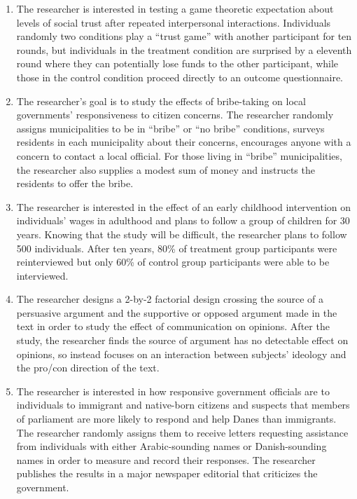 \documentclass[12pt,a4]{article}
\begin{document}
\begin{enumerate}
\item The researcher is interested in testing a game theoretic expectation about levels of social trust after repeated interpersonal interactions. Individuals randomly two conditions play a ``trust game'' with another participant for ten rounds, but individuals in the treatment condition are surprised by a eleventh round where they can potentially lose funds to the other participant, while those in the control condition proceed directly to an outcome questionnaire. %


\item The researcher's goal is to study the effects of bribe-taking on local governments' responsiveness to citizen concerns. The researcher randomly assigns municipalities to be in ``bribe'' or ``no bribe'' conditions, surveys residents in each municipality about their concerns, encourages anyone with a concern to contact a local official. For those living in ``bribe'' municipalities, the researcher also supplies a modest sum of money and instructs the residents to offer the bribe.

\item The researcher is interested in the effect of an early childhood intervention on individuals' wages in adulthood and plans to follow a group of children for 30 years. Knowing that the study will be difficult, the researcher plans to follow 500 individuals. After ten years, 80\% of treatment group participants were reinterviewed but only 60\% of control group participants were able to be interviewed. %

\item The researcher designs a 2-by-2 factorial design crossing the source of a persuasive argument and the supportive or opposed argument made in the text in order to study the effect of communication on opinions. After the study, the researcher finds the source of argument has no detectable effect on opinions, so instead focuses on an interaction between subjects' ideology and the pro/con direction of the text. %

\item The researcher is interested in how responsive government officials are to individuals to immigrant and native-born citizens and suspects that members of parliament are more likely to respond and help Danes than immigrants. The researcher randomly assigns them to receive letters requesting assistance from individuals with either Arabic-sounding names or Danish-sounding names in order to measure and record their responses. The researcher publishes the results in a major newspaper editorial that criticizes the government. %


\end{enumerate}
\end{document}
